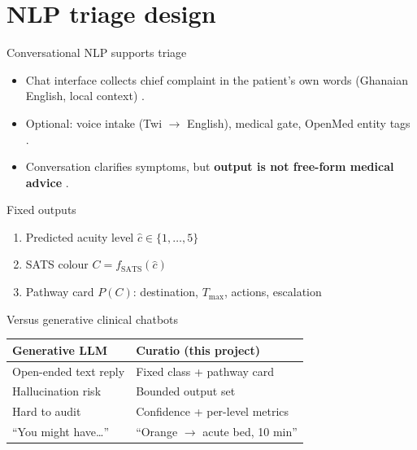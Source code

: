 \section{NLP triage design}

\begin{frame}{Conversational NLP supports triage}
  \small
  \begin{itemize}
    \item Chat interface collects chief complaint in the patient's own words (Ghanaian English, local context) \citep{Stewart2023, An2025}.
    \item Optional: voice intake (Twi $\to$ English), medical gate, OpenMed entity tags \citep{Lee2020, thisstudy2026}.
    \item Conversation clarifies symptoms, but \textbf{output is not free-form medical advice} \citep{Cheng2025, Stewart2023}.
  \end{itemize}

  \vspace{0.15cm}
  \begin{block}{Fixed outputs}
    \begin{enumerate}
      \item Predicted acuity level $\hat{c} \in \{1,\ldots,5\}$ \citep{Gligorijevic2018, Lee2020}
      \item SATS colour $C = f_{\mathrm{SATS}}(\hat{c})$ \citep{SATS2012, Rominski2014}
      \item Pathway card $P(C)$: destination, $T_{\max}$, actions, escalation \citep{Sundstrom2014}
    \end{enumerate}
  \end{block}
\end{frame}

\begin{frame}{Versus generative clinical chatbots}
  \footnotesize
  \begin{tabular}{@{}p{4.2cm}p{4.2cm}@{}}
    \toprule
    Generative LLM & Curatio (this project) \\
    \midrule
    Open-ended text reply \citep{An2025} & Fixed class + pathway card \citep{Stewart2023} \\
    Hallucination risk \citep{Stewart2023} & Bounded output set \citep{thisstudy2026} \\
    Hard to audit \citep{Cheng2025} & Confidence + per-level metrics \citep{thisstudy2026} \\
    ``You might have\ldots'' & ``Orange $\to$ acute bed, 10 min'' \citep{SATS2012} \\
    \bottomrule
  \end{tabular}

  \vspace{0.2cm}
\end{frame}
